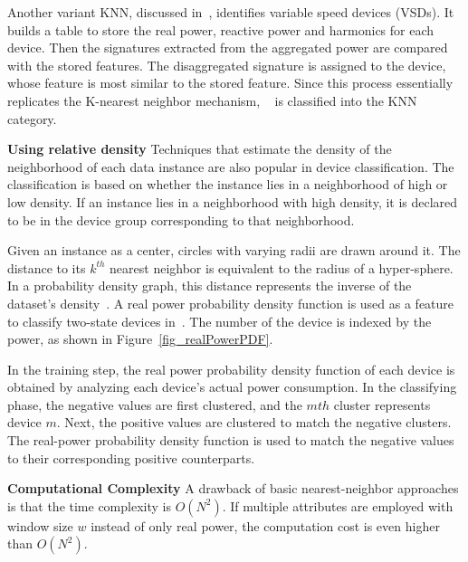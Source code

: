 
Another variant KNN, discussed in~\cite{lee2005estimation},  
identifies variable speed devices (VSDs).
It builds a table to store
the real power, reactive power and harmonics for each device.
Then the signatures extracted from the aggregated power
are compared with the stored features.
The disaggregated signature is assigned to the device,
whose feature is most similar to the stored feature.
Since this process essentially replicates the K-nearest neighbor mechanism,
~\cite{lee2005estimation} is classified into the KNN category.


\textbf{Using relative density}
Techniques that estimate the density of the neighborhood of each data instance are also popular in device classification.
The classification is based on whether the instance lies in a neighborhood of high or low density.  If an instance lies in a neighborhood with high density, it is declared to be in the device group corresponding to that neighborhood. 

Given an instance as a center, circles with varying radii are drawn around it.
The distance to its $k^{th}$ nearest neighbor is equivalent 
to the radius of a hyper-sphere. 
In a probability density graph, 
this distance represents the inverse of 
the dataset's density~\cite{kolter2010redd}.
A real power probability density function is used 
as a feature to classify two-state devices in~\cite{zeifman2011viterbi}.
The number of the device is indexed by the power, 
as shown in Figure~\ref{fig_realPowerPDF}.

In the training step, 
the real power probability density function of each device 
is obtained by analyzing each device's actual power consumption. 
In the classifying phase,
the negative values are first clustered, and the $mth$ cluster
represents device $m$.
Next, the positive values are clustered to match the negative clusters.
The real-power probability density function is used to match the negative values to their corresponding positive counterparts.


\textbf{Computational Complexity}
A drawback of basic nearest-neighbor approaches is that the 
time complexity is $O(N^2)$.
If multiple attributes are employed with window size $w$ instead of only 
real power, the computation cost is even higher than $O(N^2)$. 

